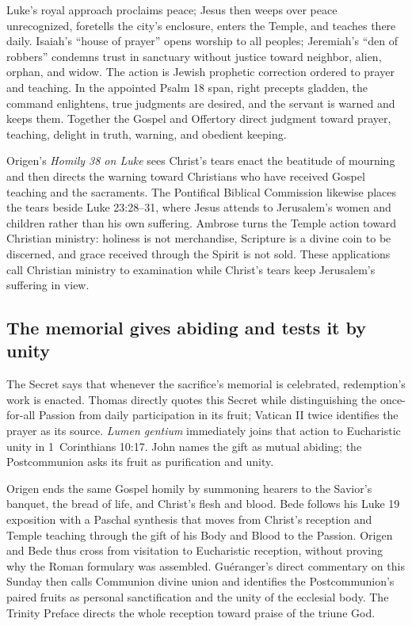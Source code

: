 \begin{deepstudy}
{Luke's royal approach proclaims peace; Jesus then weeps over peace unrecognized, foretells the city's enclosure, enters the Temple, and teaches there daily. Isaiah's ``house of prayer'' opens worship to all peoples; Jeremiah's ``den of robbers'' condemns trust in sanctuary without justice toward neighbor, alien, orphan, and widow. The action is Jewish prophetic correction ordered to prayer and teaching. In the appointed Psalm 18 span, right precepts gladden, the command enlightens, true judgments are desired, and the servant is warned and keeps them. Together the Gospel and Offertory direct judgment toward prayer, teaching, delight in truth, warning, and obedient keeping.

Origen's \emph{Homily 38 on Luke} sees Christ's tears enact the beatitude of mourning and then directs the warning toward Christians who have received Gospel teaching and the sacraments. The Pontifical Biblical Commission likewise places the tears beside Luke 23:28--31, where Jesus attends to Jerusalem's women and children rather than his own suffering. Ambrose turns the Temple action toward Christian ministry: holiness is not merchandise, Scripture is a divine coin to be discerned, and grace received through the Spirit is not sold. These applications call Christian ministry to examination while Christ's tears keep Jerusalem's suffering in view.

\subsection*{The memorial gives abiding and tests it by unity\enspace{}}

The Secret says that whenever the sacrifice's memorial is celebrated, redemption's work is enacted. Thomas directly quotes this Secret while distinguishing the once-for-all Passion from daily participation in its fruit; Vatican II twice identifies the prayer as its source. \emph{Lumen gentium} immediately joins that action to Eucharistic unity in 1~Corinthians 10:17. John names the gift as mutual abiding; the Postcommunion asks its fruit as purification and unity.

Origen ends the same Gospel homily by summoning hearers to the Savior's banquet, the bread of life, and Christ's flesh and blood. Bede follows his Luke 19 exposition with a Paschal synthesis that moves from Christ's reception and Temple teaching through the gift of his Body and Blood to the Passion. Origen and Bede thus cross from visitation to Eucharistic reception, without proving why the Roman formulary was assembled. Guéranger's direct commentary on this Sunday then calls Communion divine union and identifies the Postcommunion's paired fruits as personal sanctification and the unity of the ecclesial body. The Trinity Preface directs the whole reception toward praise of the triune God.

}
\end{deepstudy}
